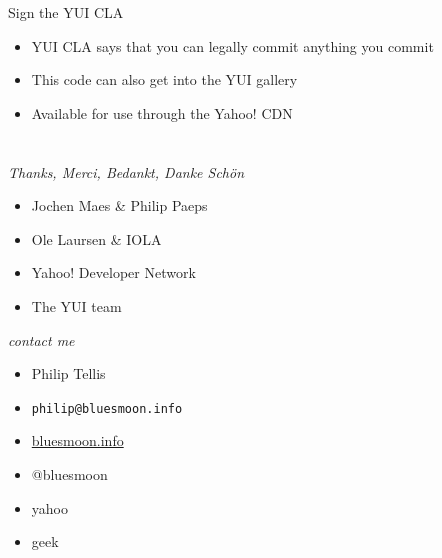 \documentclass{beamer}
\begin{document}
\begin{frame}{Sign the YUI CLA}
  \begin{itemize}
  \item YUI CLA says that you can legally commit anything you commit
  \item This code can also get into the YUI gallery
  \item Available for use through the Yahoo! CDN
  \end{itemize}
\end{frame}

\section{}
\begin{frame}{\textit{Thanks, Merci, Bedankt, Danke Sch\"on}}
  \begin{itemize}
  \item Jochen Maes \& Philip Paeps
  \item Ole Laursen \& IOLA
  \item Yahoo! Developer Network
  \item The YUI team
  \end{itemize}
\end{frame}

\begin{frame}{\textit{contact me}}
  \begin{itemize}
  \item Philip Tellis
  \item \small{\texttt{philip@bluesmoon.info}}
  \item \href{http://bluesmoon.info/}{bluesmoon.info}
  \item @bluesmoon
  \item yahoo
  \item geek
  \end{itemize}
\end{frame}
\end{document}
